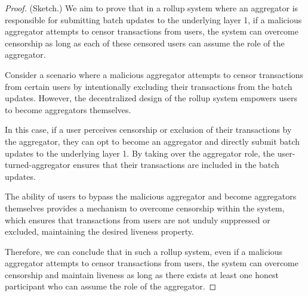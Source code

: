 \begin{proof}(Sketch.)
We aim to prove that in a rollup system where an aggregator is responsible for submitting batch updates to the underlying layer 1, if a malicious aggregator attempts to censor transactions from users, the system can overcome censorship as long as each of these censored users can assume the role of the aggregator.

Consider a scenario where a malicious aggregator attempts to censor transactions from certain users by intentionally excluding their transactions from the batch updates. However, the decentralized design of the rollup system empowers users to become aggregators themselves.

In this case, if a user perceives censorship or exclusion of their transactions by the aggregator, they can opt to become an aggregator and directly submit batch updates to the underlying layer 1. By taking over the aggregator role, the user-turned-aggregator ensures that their transactions are included in the batch updates.

The ability of users to bypass the malicious aggregator and become aggregators themselves provides a mechanism to overcome censorship within the system, which ensures that transactions from users are not unduly suppressed or excluded, maintaining the desired liveness property.

Therefore, we can conclude that in such a rollup system, even if a malicious aggregator attempts to censor transactions from users, the system can overcome censorship and maintain liveness as long as there exists at least one honest participant who can assume the role of the aggregator.
\end{proof}